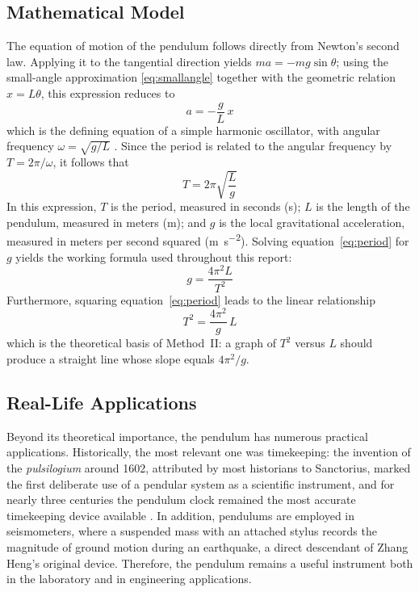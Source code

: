 \documentclass[11pt,a4paper]{article}
\begin{document}
\subsection{Mathematical Model}
The equation of motion of the pendulum follows directly from Newton's
second law. Applying it to the tangential direction yields
$ma = -mg\sin\theta$; using the small-angle approximation
\eqref{eq:smallangle} together with the geometric relation $x = L\theta$,
this expression reduces to
\begin{equation}
  a = -\frac{g}{L}\,x
  \label{eq:shm}
\end{equation}
which is the defining equation of a simple harmonic oscillator, with
angular frequency $\omega = \sqrt{g/L}$ \citep{serway2013physics}. Since
the period is related to the angular frequency by $T = 2\pi/\omega$, it
follows that
\begin{equation}
  T = 2\pi\sqrt{\frac{L}{g}}
  \label{eq:period}
\end{equation}
In this expression, $T$ is the period, measured in seconds
(\unit{\second}); $L$ is the length of the pendulum, measured in meters
(\unit{\meter}); and $g$ is the local gravitational acceleration, measured
in meters per second squared (\unit{\m\per\s\squared}). Solving
equation~\eqref{eq:period} for $g$ yields the working formula used
throughout this report:
\begin{equation}
  g = \frac{4\pi^{2}L}{T^{2}}
  \label{eq:g}
\end{equation}
Furthermore, squaring equation~\eqref{eq:period} leads to the linear
relationship
\begin{equation}
  T^{2} = \frac{4\pi^{2}}{g}\,L
  \label{eq:linear}
\end{equation}
which is the theoretical basis of Method~II: a graph of $T^{2}$ versus
$L$ should produce a straight line whose slope equals $4\pi^{2}/g$.

\subsection{Real-Life Applications}
Beyond its theoretical importance, the pendulum has numerous practical
applications. Historically, the most relevant one was timekeeping: the
invention of the \emph{pulsilogium} around 1602, attributed by most
historians to Sanctorius, marked the first deliberate use of a pendular
system as a scientific instrument, and for nearly three centuries the pendulum clock remained the most accurate timekeeping device available \citep{ferreira2026historia, britannica2026pendulum}. 
In addition, pendulums are employed in
seismometers, where a suspended mass with an attached stylus records the
magnitude of ground motion during an earthquake, a direct descendant of
Zhang Heng's original device. Therefore, the pendulum remains a useful
instrument both in the laboratory and in engineering applications.
\end{document}
